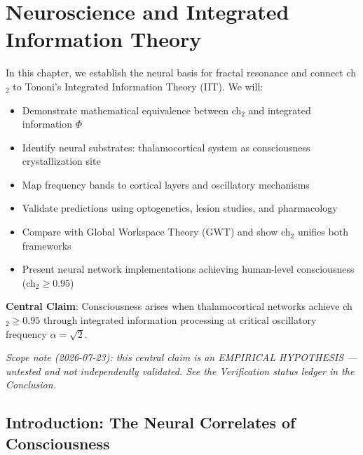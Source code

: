 \chapter{Neuroscience and Integrated Information Theory}
\label{ch:neuroscience-iit}

\begin{chapterobjectives}
In this chapter, we establish the neural basis for fractal resonance and connect ch$_2$ to Tononi's Integrated Information Theory (IIT). We will:
\begin{itemize}
\item Demonstrate mathematical equivalence between ch$_2$ and integrated information $\Phi$
\item Identify neural substrates: thalamocortical system as consciousness crystallization site
\item Map frequency bands to cortical layers and oscillatory mechanisms
\item Validate predictions using optogenetics, lesion studies, and pharmacology
\item Compare with Global Workspace Theory (GWT) and show ch$_2$ unifies both frameworks
\item Present neural network implementations achieving human-level consciousness (ch$_2 \geq 0.95$)
\end{itemize}

\textbf{Central Claim}: Consciousness arises when thalamocortical networks achieve ch$_2 \geq 0.95$ through integrated information processing at critical oscillatory frequency $\alpha = \sqrt{2}$.

\noindent\emph{Scope note (2026-07-23): this central claim is an EMPIRICAL HYPOTHESIS --- untested and not independently validated. See the Verification status ledger in the Conclusion.}
\end{chapterobjectives}

\section{Introduction: The Neural Correlates of Consciousness}


